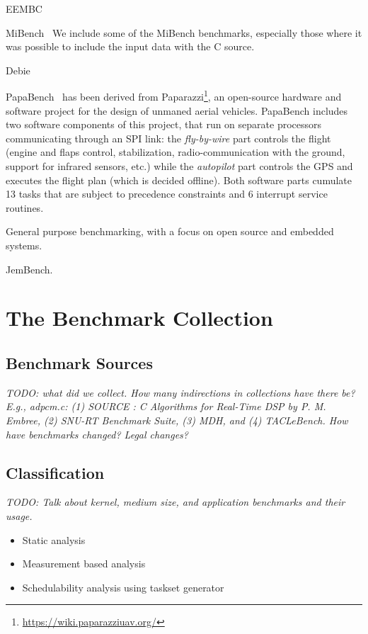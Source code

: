 \documentclass[a4paper,UKenglish]{oasics}
\newcommand{\todo}[1]{{\emph{TODO: #1}}}
\begin{document}
EEMBC

MiBench~\cite{MiBench} We include some of the MiBench benchmarks, especially
those where it was possible to include the input data with the C source.

Debie~\cite{debie}

PapaBench~\cite{papabench} has been derived from  Paparazzi\footnote{\url{https://wiki.paparazziuav.org/}}, 
an open-source hardware and software project for the design of unmaned aerial vehicles.  PapaBench includes 
two software components of this project, that run on separate processors communicating through an SPI link:
the \textit{fly-by-wire} part controls the flight (engine and flaps control, stabilization, radio-communication 
with the ground, support for infrared sensors, etc.) while the \textit{autopilot} part controls the GPS and 
executes the flight plan (which is decided offline). Both software parts  cumulate 13 tasks that are subject
to precedence constraints and 6 interrupt service routines.


General purpose benchmarking, with a focus on open source and embedded systems.

JemBench.

\section{The Benchmark Collection}
\label{sec:collect}


\subsection{Benchmark Sources}

\todo{what did we collect. How many indirections in collections have there be?
E.g., adpcm.c: (1) SOURCE : C Algorithms for Real-Time DSP by P. M. Embree,
(2) SNU-RT Benchmark Suite, (3) MDH, and (4) TACLeBench. How have
benchmarks  changed? Legal changes?}

\subsection{Classification}

\todo{Talk about kernel, medium size, and application benchmarks and their usage.}
\begin{itemize}
\item Static analysis
\item Measurement based analysis
\item Schedulability analysis using taskset generator
\end{itemize}
\end{document}
